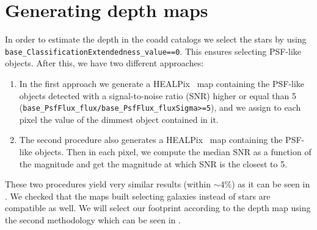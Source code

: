\documentclass[\docopts]{\docclass}
\begin{document}

\section{Generating depth maps}
\label{sec:masking}

In order to estimate the depth in the coadd catalogs we select the stars by using \texttt{base\_ClassificationExtendedness\_value==0}. This ensures selecting
PSF-like objects. After this, we have two different approaches:

\begin{enumerate}
\item In the first approach we generate a HEALPix~\citep{2005ApJ...622..759G} map containing the PSF-like objects detected with a signal-to-noise ratio (SNR) higher or equal than 5 (\texttt{base\_PsfFlux\_flux/base\_PsfFlux\_fluxSigma>=5}), and we assign to each pixel the value of the
dimmest object contained in it.
\item The second procedure also generates a HEALPix~\citep{2005ApJ...622..759G} map containing the PSF-like objects. Then in each pixel, we compute the median SNR as a function of the magnitude and get the magnitude at which SNR is the closest to 5.
\end{enumerate}

These two procedures yield very similar results (within $\sim 4\%$) as it can be seen in . We checked that the maps built selecting galaxies instead of stars are compatible as well. We will select our footprint according to the depth map using the second methodology which can be seen in .
\end{document}
